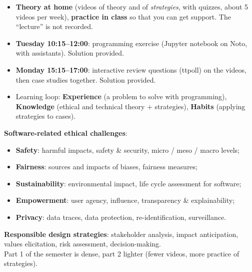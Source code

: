 \documentclass[11pt,a4paper,openany]{book}
\begin{document}
\begin{rembox}[title={Course format: a flipped class}]
\begin{itemize}
  \item \textbf{Theory at home} (videos of theory and of \emph{strategies}, with quizzes,
        about 5 videos per week), \textbf{practice in class} so that you can get support.
        The ``lecture'' is not recorded.
  \item \textbf{Tuesday 10:15--12:00}: programming exercise (Jupyter notebook on Noto, with
        assistants). Solution provided.
  \item \textbf{Monday 15:15--17:00}: interactive review questions (ttpoll) on the videos, then
        case studies together. Solution provided.
  \item Learning loop: \textbf{Experience} (a problem to solve with programming),
        \textbf{Knowledge} (ethical and technical theory + strategies), \textbf{Habits}
        (applying strategies to cases).
\end{itemize}
\end{rembox}

\begin{rembox}[title={Contents of the course}]
\textbf{Software-related ethical challenges}:
\begin{itemize}
  \item \textbf{Safety}: harmful impacts, safety \& security, micro / meso / macro levels;
  \item \textbf{Fairness}: sources and impacts of biases, fairness measures;
  \item \textbf{Sustainability}: environmental impact, life cycle assessment for software;
  \item \textbf{Empowerment}: user agency, influence, transparency \& explainability;
  \item \textbf{Privacy}: data traces, data protection, re-identification, surveillance.
\end{itemize}
\textbf{Responsible design strategies}: stakeholder analysis, impact anticipation, values
elicitation, risk assessment, decision-making. \\
Part 1 of the semester is dense, part 2 lighter (fewer videos, more practice of strategies).
\end{rembox}
\end{document}
